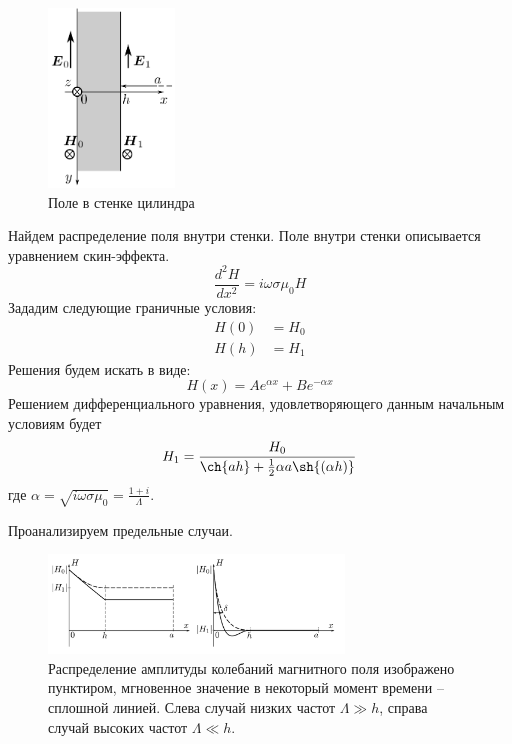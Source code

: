 \begin{figure}
	\vspace{-10pt}
	\centering
	\includegraphics[width=0.3\textwidth]{../res/wall.png}
	\caption{Поле в стенке цилиндра}
	\label{fig:wall}
\end{figure}

Найдем распределение поля внутри стенки. Поле внутри стенки описывается уравнением скин-эффекта. 
$$
\frac{d^2 H}{dx^2} = i \omega \sigma \mu_0 H
$$
Зададим следующие граничные условия: 
\begin{equation*}
	\begin{split}
		H(0) &= H_0 \\
		H(h) &= H_1
	\end{split}
\end{equation*}
Решения будем искать в виде:
$$
H(x) = A e^{\alpha x} + B e^{-\alpha x}
$$
Решением дифференциального уравнения, удовлетворяющего данным начальным условиям будет
\begin{equation}
	H_1 = \frac{H_0}{\ch{ah} + \frac{1}{2} \alpha a \sh{\left( \alpha h \right)}}
	\label{eq:solution}
\end{equation}
где $\alpha = \sqrt{i \omega \sigma \mu_0} = \frac{1 + i}{\Lambda}$.

Проанализируем предельные случаи.

\begin{figure}[H]
	\centering
	\includegraphics[width=0.7\textwidth]{../res/graphs.png}
	\caption{Распределение амплитуды колебаний магнитного поля изображено пунктиром, мгновенное значение в некоторый момент времени -- сплошной линией. Слева случай низких частот $\Lambda \gg h$, справа случай высоких частот $\Lambda \ll h$.}
	\label{fig:graphs}
\end{figure}

